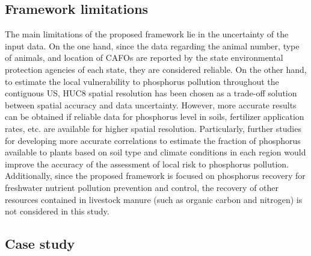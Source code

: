 \documentclass[authoryear]{elsarticle}
\begin{document}

\subsection{Framework limitations}
The main limitations of the proposed framework lie in the uncertainty of the input data. On the one hand, since the data regarding the animal number, type of animals, and location of CAFOs are reported by the state environmental protection agencies of each state, they are considered reliable. On the other hand, to estimate the local vulnerability to phosphorus pollution throughout the contiguous US, HUC8 spatial resolution has been chosen as a trade-off solution between spatial accuracy and data uncertainty. However, more accurate results can be obtained if reliable data for phosphorus level in soils, fertilizer  application rates, etc. are available for higher spatial resolution. Particularly, further studies for developing more accurate correlations to estimate the fraction of phosphorus available to plants based on soil type and climate conditions in each region would improve the accuracy of the assessment of local risk to phosphorus pollution. Additionally, since the proposed framework is focused on phosphorus recovery for freshwater nutrient pollution prevention and control, the recovery of other resources contained in livestock manure (such as organic carbon and nitrogen) is not considered in this study.



\subsection{Case study}
\end{document}
